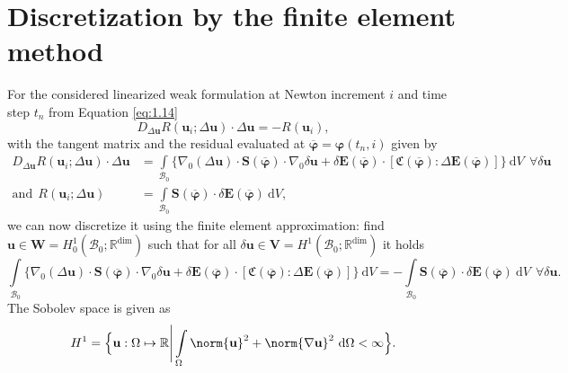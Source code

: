 \documentclass[11pt,a4paper,final]{article}
\begin{document}
\section{Discretization by the finite element method}
For the considered linearized weak formulation at Newton increment $i$ and time step $t_n$ from Equation \eqref{eq:1.14}
\begin{equation}
D_{\Delta \mathbf{u}} R(\mathbf{u}_i; \Delta \mathbf{u}) \cdot \Delta\mathbf{u} = -R(\mathbf{u}_{i}) ,
\label{eq:1.24}
\end{equation}
with the tangent matrix and the residual evaluated at $\overline{\bm{\varphi}} = \bm{\varphi}(t_n,i)$ given by
\begin{align*}
D_{\Delta\mathbf{u}} R(\mathbf{u}_i; \Delta \mathbf{u}) \cdot \Delta\mathbf{u} &= \int\limits_{\mathcal{B}_0} \Big\lbrace \nabla_0 (\Delta\mathbf{u}) \cdot \mathbf{S}(\overline{\bm{\varphi}}) \cdot \nabla_0 \delta\mathbf{u} + \delta \mathbf{E}(\overline{\bm{\varphi}}) \cdot \left[ \mathfrak{C}(\overline{\bm{\varphi}}) : \Delta\mathbf{E}(\overline{\bm{\varphi}}) \right] \Big\rbrace \ \mathrm{d}V \ \ \forall \delta\mathbf{u} \\
\text{and} \ \ R(\mathbf{u}_i; \Delta \mathbf{u}) &= \int\limits_{\mathcal{B}_0} \mathbf{S}(\overline{\bm{\varphi}}) \cdot \delta \mathbf{E}(\overline{\bm{\varphi}}) \ \mathrm{d}V,
\end{align*}
we can now discretize it using the finite element approximation: find $\mathbf{u} \in \mathbf{W} = H^1_0 (\mathcal{B}_0; \mathbb{R}^{\text{dim}})$ such that for all $\delta\mathbf{u} \in \mathbf{V} = H^1 (\mathcal{B}_0; \mathbb{R}^{\text{dim}})$ it holds
\begin{equation}
\int\limits_{\mathcal{B}_0} \Big\lbrace \nabla_0 (\Delta\mathbf{u}) \cdot \mathbf{S}(\overline{\bm{\varphi}}) \cdot \nabla_0 \delta\mathbf{u} + \delta \mathbf{E}(\overline{\bm{\varphi}}) \cdot \left[ \mathfrak{C}(\overline{\bm{\varphi}}) : \Delta\mathbf{E}(\overline{\bm{\varphi}}) \right] \Big\rbrace \ \mathrm{d}V = -\int\limits_{\mathcal{B}_0} \mathbf{S}(\overline{\bm{\varphi}}) \cdot \delta \mathbf{E}(\overline{\bm{\varphi}}) \ \mathrm{d}V \ \ \forall \delta\mathbf{u}.
\label{eq:1.23}
\end{equation}
The Sobolev space is given as 
\begin{equation}
H^1 = \Big\lbrace \mathbf{u}: \Omega \mapsto \mathbb{R} \Bigg| \int\limits_{\Omega} \norm{\mathbf{u}}^2 + \norm{\nabla \mathbf{u}}^2 \ \mathrm{d}\Omega < \infty \Big\rbrace.
\end{equation}
\end{document}
